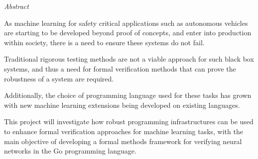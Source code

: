 \documentclass[11pt, oneside]{Thesis} %
\begin{document}
{\huge{\textit{Abstract}} \par}{ 

    As machine learning for safety critical applications such as autonomous vehicles are starting to be developed beyond proof of concepts, and enter into 
    production within society, there is a need to ensure these systems do not fail.

    Traditional rigorous testing methods are not a viable approach for such black box systems, and thus a need for formal verification methods that can 
    prove the robustness of a system are required.

    Additionally, the choice of programming language used for these tasks has grown with new machine learning extensions being developed on existing languages.

    This project will investigate how robust programming infrastructures can be used
    to enhance formal verification approaches for machine learning tasks, with the 
    main objective of developing a formal methods framework for verifying neural networks in the Go programming language.

    \clearpage %






    \pagestyle{fancy} %

    \tableofcontents %

}
\end{document}
